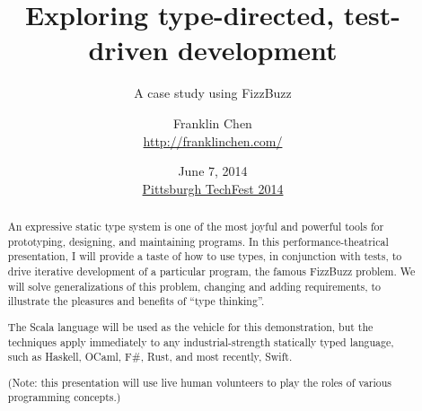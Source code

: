{
}

\usepackage[utf8]{inputenc}

\usepackage[cache]{minted}


\title[Exploring type-directed TDD w/FizzBuzz]{Exploring type-directed, test-driven development}
\subtitle{A case study using FizzBuzz}
\author{Franklin Chen \\ \url{http://franklinchen.com/}}
\date[\href{http://www.pghtechfest.com/}{Pittsburgh TechFest 2014}]{June 7, 2014 \\ \href{http://www.pghtechfest.com/}{Pittsburgh TechFest 2014}}

\subject{Talks}




\maketitle

\begin{abstract}
  An expressive static type system is one of the most joyful and
  powerful tools for prototyping, designing, and maintaining
  programs. In this performance-theatrical presentation, I will
  provide a taste of how to use types, in conjunction with tests, to
  drive iterative development of a particular program, the famous
  FizzBuzz problem. We will solve generalizations of this problem,
  changing and adding requirements, to illustrate the pleasures and
  benefits of ``type thinking''.

  The Scala language will be used as the vehicle for this
  demonstration, but the techniques apply immediately to any
  industrial-strength statically typed language, such as Haskell,
  OCaml, F\#, Rust, and most recently, Swift.

  (Note: this presentation will use live human volunteers to play the
  roles of various programming concepts.)
\end{abstract}

\begin{frame}
  \titlepage
\end{frame}

